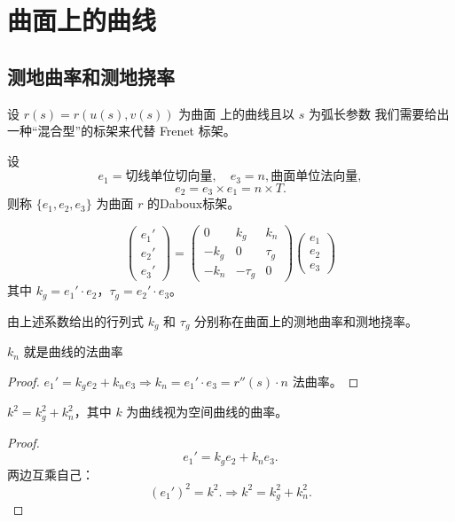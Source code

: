 \documentclass[lang=cn,10pt,thmcnt=section]{elegantbook}
\begin{document}
\chapter{曲面上的曲线}
\section{测地曲率和测地挠率}
设 $r(s) = r(u(s), v(s))$ 为曲面
上的曲线且以 $s$ 为弧长参数
我们需要给出一种“混合型”的标架来代替 Frenet 标架。
\begin{definition}[Daboux标架]
    设
    \[
    e_1 = \text{切线单位切向量}, \quad e_3 = n, \text{曲面单位法向量},
    \]
    \[
    e_2 = e_3 \times e_1 = n \times T.
    \]
    则称 $\{e_1, e_2, e_3\}$ 为曲面 $r$ 的Daboux标架。
\end{definition}
\begin{definition}[Daboux公式]
    \[
\begin{pmatrix}
e_1' \\
e_2' \\
e_3'
\end{pmatrix}
=
\begin{pmatrix}
0 & k_g & k_n \\
-k_g & 0 & \tau_g \\
-k_n & -\tau_g & 0
\end{pmatrix}
\begin{pmatrix}
e_1 \\
e_2 \\
e_3
\end{pmatrix}
\]
其中 $k_g = e_1' \cdot e_2$，$\tau_g = e_2' \cdot e_3$。

由上述系数给出的行列式 $k_g$ 和 $\tau_g$ 分别称在曲面上的测地曲率和测地挠率。
\end{definition}
\begin{proposition}
    $k_n$ 就是曲线的法曲率
\end{proposition}
\begin{proof}
    $e_1' = k_g e_2 + k_n e_3 \Rightarrow k_n = e_1' \cdot e_3 = r''(s) \cdot n$ 法曲率。
\end{proof}

\begin{proposition}
    $k^2 = k_g^2 + k_n^2$，其中 $k$ 为曲线视为空间曲线的曲率。
\end{proposition}
\begin{proof}
    \[
e_1' = k_g e_2 + k_n e_3.
\]
两边互乘自己：
\[
(e_1')^2 = k^2.\Rightarrow k^2 = k_g^2 + k_n^2.
\]
\end{proof}
\end{document}
